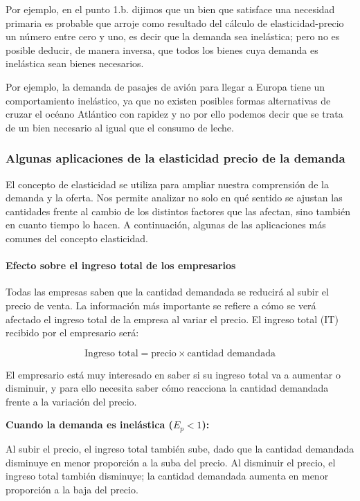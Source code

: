 \documentclass[12pt,a4paper]{article}
\begin{document}
Por ejemplo, en el punto 1.b. dijimos que un bien que satisface una necesidad primaria es probable que arroje como resultado del cálculo de elasticidad-precio un número entre cero y uno, es decir que la demanda sea inelástica; pero no es posible deducir, de manera inversa, que todos los bienes cuya demanda es inelástica sean bienes necesarios.

Por ejemplo, la demanda de pasajes de avión para llegar a Europa tiene un comportamiento inelástico, ya que no existen posibles formas alternativas de cruzar el océano Atlántico con rapidez y no por ello podemos decir que se trata de un bien necesario al igual que el consumo de leche.

\subsubsection{Algunas aplicaciones de la elasticidad precio de la demanda}

El concepto de elasticidad se utiliza para ampliar nuestra comprensión de la demanda y la oferta. Nos permite analizar no solo en qué sentido se ajustan las cantidades frente al cambio de los distintos factores que las afectan, sino también en cuanto tiempo lo hacen. A continuación, algunas de las aplicaciones más comunes del concepto elasticidad.

\paragraph{Efecto sobre el ingreso total de los empresarios}

Todas las empresas saben que la cantidad demandada se reducirá al subir el precio de venta. La información más importante se refiere a cómo se verá afectado el ingreso total de la empresa al variar el precio. El ingreso total (IT) recibido por el empresario será:

\[
\text{Ingreso total} = \text{precio} \times \text{cantidad demandada}
\]

El empresario está muy interesado en saber si su ingreso total va a aumentar o disminuir, y para ello necesita saber cómo reacciona la cantidad demandada frente a la variación del precio.

\textbf{Cuando la demanda es inelástica ($E_p < 1$):}

Al subir el precio, el ingreso total también sube, dado que la cantidad demandada disminuye en menor proporción a la suba del precio. Al disminuir el precio, el ingreso total también disminuye; la cantidad demandada aumenta en menor proporción a la baja del precio.
\end{document}
